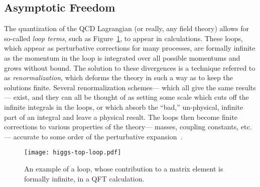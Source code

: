 \subsection{Asymptotic Freedom}
\label{chapter:sm:qcd:freedom}
The quantization of the QCD Lagrangian (or really, any field theory) allows for so-called \textit{loop terms}, such as Figure~\ref{fig:sm:loop}, to appear in calculations. These loops, which appear as perturbative corrections for many processes, are formally infinite as the momentum in the loop is integrated over all possible momentums and grows without bound. The solution to these divergences is a technique referred to as \textit{renormalization}, which deforms the theory in such a way as to keep the solutions finite. Several renormalization schemes--- which all give the same results--- exist, and they can all be thought of as setting some scale which cuts off the infinite integrals in the loops, or which absorb the ``bad,'' un-physical, infinite part of an integral and leave a physical result. The loops then become finite corrections to various properties of the theory--- masses, coupling constants, etc.--- accurate to some order of the perturbative expansion~\cite{schwartz}.


\begin{figure}
\centering
\texttt{[image: higgs-top-loop.pdf]}
\caption{An example of a loop, whose contribution to a matrix element is formally infinite, in a QFT calculation.}
\label{fig:sm:loop}
\end{figure}



